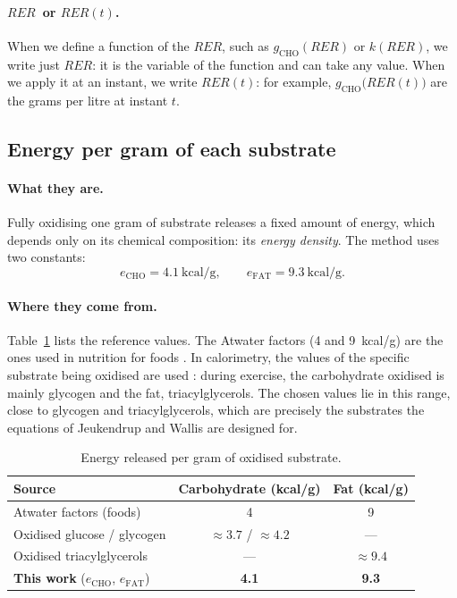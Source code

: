 \documentclass[10pt,a4paper]{article}
\newcommand{\sub}[1]{{\scriptscriptstyle\mathrm{#1}}}   %
\newcommand{\CHO}{\sub{CHO}}
\newcommand{\FAT}{\sub{FAT}}
\newcommand{\RER}{\ensuremath{\mathit{RER}}}
\newcommand{\kcal}{\ensuremath{\mathrm{kcal}}}
\begin{document}
\paragraph{\RER\ or $\RER(t)$.} When we define a function of the \RER, such as
$g_{\CHO}(\RER)$ or $k(\RER)$, we write just \RER: it is the variable of the function and
can take any value. When we apply it at an instant, we write $\RER(t)$: for example,
$g_{\CHO}\bigl(\RER(t)\bigr)$ are the grams per litre at instant $t$.

\subsection{Energy per gram of each substrate}\label{sec:e}
\paragraph{What they are.} Fully oxidising one gram of substrate releases a fixed amount
of energy, which depends only on its chemical composition: its \emph{energy density}. The
method uses two constants:
\begin{equation}
  e_{\CHO}=4.1~\kcal/\mathrm{g},\qquad e_{\FAT}=9.3~\kcal/\mathrm{g}.
  \label{eq:e}
\end{equation}

\paragraph{Where they come from.} Table~\ref{tab:densitats} lists the reference values.
The Atwater factors (4 and 9~kcal/g) are the ones used in nutrition for foods
\citep{atwater1900}. In calorimetry, the values of the specific substrate being oxidised
are used \citep{livesey1988}: during exercise, the carbohydrate oxidised is mainly glycogen
and the fat, triacylglycerols. The chosen values lie in this range, close to glycogen and
triacylglycerols, which are precisely the substrates the equations of Jeukendrup and Wallis
are designed for.

\begin{table}[H]
\centering
\caption{Energy released per gram of oxidised substrate.}
\label{tab:densitats}
\small
\begin{tabular}{@{}lcc@{}}
\toprule
Source & Carbohydrate (kcal/g) & Fat (kcal/g) \\
\midrule
Atwater factors (foods) \citep{atwater1900} & 4 & 9 \\
Oxidised glucose / glycogen \citep{livesey1988} & $\approx3.7$ / $\approx4.2$ & --- \\
Oxidised triacylglycerols \citep{livesey1988} & --- & $\approx9.4$ \\
\textbf{This work} ($e_{\CHO}$, $e_{\FAT}$) & \textbf{4.1} & \textbf{9.3} \\
\bottomrule
\end{tabular}
\end{table}
\end{document}

